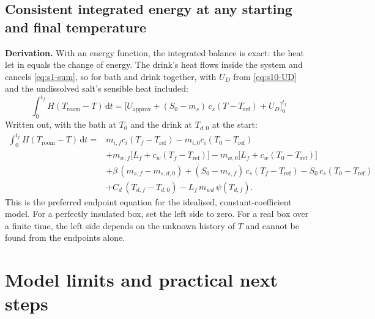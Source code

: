 \documentclass[11pt,a4paper]{article}
\newcommand{\dd}{\mathrm{d}}
\newcommand{\Troom}{T_{\mathrm{room}}}
\newcommand{\para}[1]{\par\smallskip\noindent\textbf{#1}\enspace}
\begin{document}
\subsection{Consistent integrated energy at any starting and final temperature}
\para{Derivation.} With an energy function, the integrated balance is exact: the heat let in equals the
change of energy. The drink's heat flows inside the system and cancels \eqref{eq:s1-sum}, so for bath and
drink together, with $U_D$ from \eqref{eq:s10-UD} and the undissolved salt's sensible heat included:
\begin{equation}
\boxed{\,\int_0^{t_f} H(\Troom - T)\,\dd t = \big[U_{\mathrm{approx}} + (S_0 - m_s)\,c_s(T - T_{\mathrm{ref}}) + U_D\big]_0^{t_f}\,} \label{eq:refine-integral}
\end{equation}
Written out, with the bath at $T_0$ and the drink at $T_{d,0}$ at the start:
\begin{equation}
\begin{split}
\int_0^{t_f} H(\Troom - T)\,\dd t = {}& m_{i,f}c_i(T_f - T_{\mathrm{ref}}) - m_{i,0}c_i(T_0 - T_{\mathrm{ref}})\\
&+ m_{w,f}\big[L_f + c_w(T_f - T_{\mathrm{ref}})\big] - m_{w,0}\big[L_f + c_w(T_0 - T_{\mathrm{ref}})\big]\\
&+ \beta\,(m_{s,f} - m_{s,d,0}) + (S_0 - m_{s,f})\,c_s(T_f - T_{\mathrm{ref}}) - S_0\,c_s(T_0 - T_{\mathrm{ref}})\\
&+ C_d\,(T_{d,f} - T_{d,0}) - L_f\,m_{wd}\,\psi(T_{d,f}) .
\end{split}
\label{eq:refine-expanded}
\end{equation}
This is the preferred endpoint equation for the idealised, constant-coefficient model. For a perfectly
insulated box, set the left side to zero. For a real box over a finite time, the left side depends on the
unknown history of $T$ and cannot be found from the endpoints alone.

\section{Model limits and practical next steps}\label{sec:limits}
\end{document}
